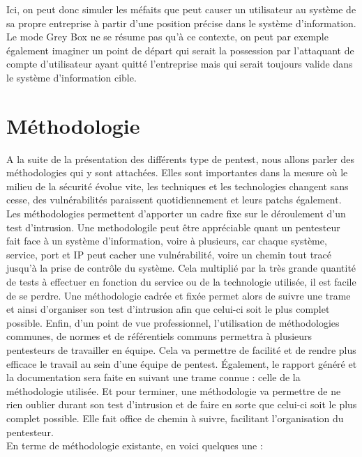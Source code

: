 \documentclass[a4paper]{memoir}
\begin{document}
Ici, on peut donc simuler les méfaits que peut causer un utilisateur au système de sa propre entreprise à partir d’une position précise dans le système d’information. Le mode Grey Box ne se résume pas qu’à ce contexte, on peut par exemple également imaginer un point de départ qui serait la possession par l’attaquant de compte d’utilisateur ayant quitté l’entreprise mais qui serait toujours valide dans le système d’information cible.


\section{Méthodologie}

A la suite de la présentation des différents type de pentest, nous allons parler des méthodologies qui y sont attachées.
Elles sont importantes dans la mesure où le milieu de la sécurité évolue vite, les techniques et les technologies changent sans cesse, des vulnérabilités paraissent quotidiennement et leurs patchs également. Les méthodologies permettent d’apporter un cadre fixe sur le déroulement d’un test d’intrusion.
Une methodologile peut être appréciable quant un pentesteur fait face à un système d’information, voire à plusieurs, car chaque système, service, port et IP peut cacher une vulnérabilité, voire un chemin tout tracé jusqu’à la prise de contrôle du système. Cela multiplié par la très grande quantité de tests à effectuer en fonction du service ou de la technologie utilisée, il est facile de se perdre. Une méthodologie cadrée et fixée permet alors de suivre une trame et ainsi d’organiser son test d’intrusion afin que celui-ci soit le plus complet possible.
Enfin, d'un point de vue professionnel, l'utilisation de méthodologies communes, de normes et de référentiels communs permettra à plusieurs pentesteurs de travailler en équipe. Cela va permettre de facilité et de rendre plus efficace le travail au sein d’une équipe de pentest. Également, le rapport généré et la documentation sera faite en suivant une trame connue : celle de la méthodologie utilisée.
Et pour terminer, une méthodologie va permettre de ne rien oublier durant son test d’intrusion et de faire en sorte que celui-ci soit le plus complet possible. Elle fait office de chemin à suivre, facilitant l’organisation du pentesteur.\\

En terme de méthodologie existante, en voici quelques une :
\end{document}
